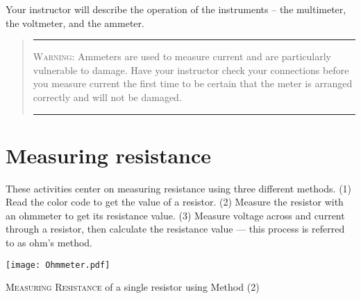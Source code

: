 Your instructor will describe the operation of the instruments -- the multimeter, the voltmeter, and the ammeter. 
\begin{quote}\hrule
\textsc{Warning}:  Ammeters are used to measure current and are particularly vulnerable to damage.  Have your instructor check your connections before you measure current the first time to be certain that the meter is arranged correctly and will not be damaged. 
\hrule
\end{quote}


\section {Measuring resistance}
These activities center on measuring resistance using three different methods. (1) Read the color code to get the value of a resistor. (2) Measure the resistor with an ohmmeter to get  its resistance value. (3) Measure voltage across and current through a resistor, then calculate the resistance value --- this process is  referred to as ohm's method.

\begin{marginfigure}
	\texttt{[image: Ohmmeter.pdf]}
	\caption{\textsc{Measuring Resistance} of a single resistor using Method (2)}
	\label{f:mohm}
\end{marginfigure}

